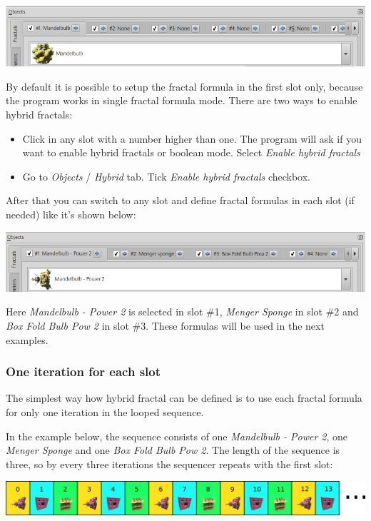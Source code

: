 \includegraphics[width=\linewidth]{img/manual/media/fractal_tabs.png}

By default it is possible to setup the fractal formula in the first slot only,
because the program works in single fractal formula mode. There are two ways to
enable hybrid fractals:
\begin{itemize}
    \item Click in any slot with a number higher than one. The program will ask if you want to
	    enable hybrid fractals or boolean mode. Select \emph{Enable hybrid fractals}
	\item Go to \emph{Objects} / \emph{Hybrid} tab. Tick \emph{Enable hybrid fractals} checkbox.
\end{itemize}

After that you can switch to any slot and define fractal formulas in each slot
(if needed) like it's shown below:

\includegraphics[width=\linewidth]{img/manual/media/fractal_tabs_with_defined_fractals.png}

Here \emph{Mandelbulb - Power 2} is selected in slot \#1, \emph{Menger Sponge}
in slot \#2 and \emph{Box Fold Bulb Pow 2} in slot \#3. These formulas will be
used in the next examples.

\subsubsection{One iteration for each slot}

The simplest way how hybrid fractal can be defined is to use each fractal
formula for only one iteration in the looped sequence.

In the example below, the sequence consists of one \emph{Mandelbulb - Power 2}, one \emph{Menger Sponge} and
one \emph{Box Fold Bulb Pow 2}. The length of the sequence is three, so by every three
iterations the sequencer repeats with the first slot:

\includegraphics[width=\linewidth]{img/manual/media/iteration_loop_hybrid_sequence_1.png}

